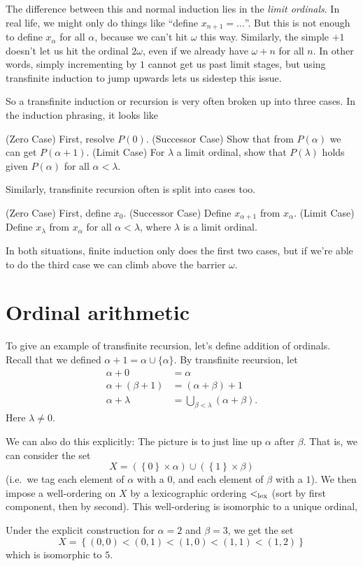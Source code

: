 The difference between this and normal induction lies in the \emph{limit ordinals}.
In real life, we might only do things like ``define $x_{n+1} = \dots$''.
But this is not enough to define $x_\alpha$ for all $\alpha$,
because we can't hit $\omega$ this way.
Similarly, the simple $+1$ doesn't let us hit the ordinal $2\omega$,
even if we already have $\omega+n$ for all $n$.
In other words, simply incrementing by $1$ cannot get us past limit stages,
but using transfinite induction to jump upwards lets us sidestep this issue.

So a transfinite induction or recursion is very often broken up into three cases.
In the induction phrasing, it looks like
\begin{itemize}
	\ii (Zero Case) First, resolve $P(0)$.
	\ii (Successor Case) Show that from $P(\alpha)$ we can get $P(\alpha+1)$.
	\ii (Limit Case) For $\lambda$ a limit ordinal,
	show that $P(\lambda)$ holds given $P(\alpha)$ for all $\alpha < \lambda$.
\end{itemize}
Similarly, transfinite recursion often is split into cases too.
\begin{itemize}
	\ii (Zero Case) First, define $x_0$.
	\ii (Successor Case) Define $x_{\alpha+1}$ from $x_\alpha$.
	\ii (Limit Case) Define $x_\lambda$ from $x_\alpha$ for all $\alpha < \lambda$,
	where $\lambda$ is a limit ordinal.
\end{itemize}
In both situations, finite induction only does the first two cases,
but if we're able to do the third case we can climb above the barrier $\omega$.

\section{Ordinal arithmetic}
To give an example of transfinite recursion, let's define addition of ordinals.
Recall that we defined $\alpha+1 = \alpha \cup \{\alpha\}$.
By transfinite recursion, let
\begin{align*}
	\alpha + 0 &= \alpha \\
	\alpha + (\beta + 1) &= (\alpha + \beta) + 1 \\
	\alpha + \lambda &= \bigcup_{\beta < \lambda} (\alpha + \beta).
\end{align*}
Here $\lambda \neq 0$.

We can also do this explicitly:
The picture is to just line up $\alpha$ after $\beta$.
That is, we can consider the set
\[
	X = 
	\left( \left\{ 0 \right\} \times \alpha \right)
	\cup
	\left( \left\{ 1 \right\} \times \beta \right)
\]
(i.e.\ we tag each element of $\alpha$ with a $0$, and
each element of $\beta$ with a $1$).
We then impose a well-ordering on $X$ by a lexicographic ordering $<_{\text{lex}}$
(sort by first component, then by second).
This well-ordering is isomorphic to a unique ordinal, 
\begin{example}
	[$2+3=5$]
	Under the explicit construction for $\alpha = 2$ and $\beta = 3$, we get the set
	\[
		X = \left\{ (0,0) < (0,1) < (1,0) < (1,1) < (1,2) \right\}
	\]
	which is isomorphic to $5$.
\end{example}


